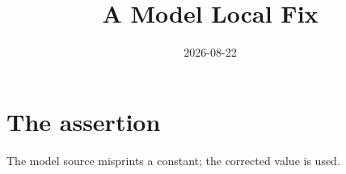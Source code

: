 \documentclass{article}
\title{A Model Local Fix}
\date{2026-08-22}
\begin{document}
\maketitle
{}
\section{The assertion}
The model source misprints a constant; the corrected value is used.
\end{document}
